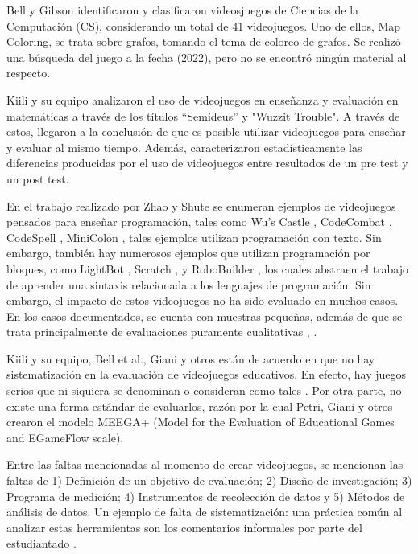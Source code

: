 \documentclass[submission]{eptcs}
\begin{document}
Bell y Gibson \cite{evaluation_of_games_for_teaching_cs} identificaron y clasificaron videosjuegos de Ciencias de la Computación (CS),
considerando un total de 41 videojuegos. Uno de ellos, Map Coloring, se trata sobre grafos, tomando el tema de coloreo de grafos.
Se realizó una búsqueda del juego a la fecha (2022), pero no se encontró ningún material al respecto.

Kiili y su equipo \cite{using_videogames_maths} analizaron el uso de videojuegos en enseñanza
y evaluación en matemáticas a través de los títulos ``Semideus'' y "Wuzzit Trouble". A través
de estos, llegaron a la conclusión de que es posible utilizar videojuegos para enseñar y
evaluar al mismo tiempo. Además, caracterizaron estadísticamente las diferencias producidas por el uso
de videojuegos entre resultados de un pre test y un post test.

En el trabajo realizado por Zhao y Shute \cite{video_game_foster_computational_thinking} se enumeran ejemplos de videojuegos pensados para enseñar programación,
tales como Wu's Castle \cite{wuscastle}, CodeCombat \cite{CodeCombat}, CodeSpell \cite{codespells}, MiniColon \cite{minicolon},
tales ejemplos utilizan programación con texto. Sin embargo, también hay numerosos ejemplos que utilizan programación por
bloques, como LightBot \cite{LightBot}, Scratch \cite{maloney2010scratch}, \cite{scratch} y RoboBuilder \cite{RoboBuilder}, los
cuales abstraen el trabajo de aprender una sintaxis relacionada a los lenguajes de programación.
Sin embargo, el impacto de estos videojuegos no ha sido evaluado en muchos casos. En los casos documentados, se cuenta con
muestras pequeñas, además de que se trata principalmente de evaluaciones puramente cualitativas \cite{video_game_foster_computational_thinking},
\cite{effectiveness_gbl}.

Kiili y su equipo, Bell et al., Giani y otros \cite{petri2018method} están de acuerdo en que no hay sistematización en la evaluación de
videojuegos educativos. En efecto, hay juegos serios que ni siquiera se denominan o consideran como tales
\cite{evaluation_of_games_for_teaching_cs}. Por otra parte, no existe una forma estándar de evaluarlos, razón por
la cual Petri, Giani y otros \cite{petri2018method} crearon el modelo MEEGA+ (Model for the Evaluation of Educational
Games and EGameFlow scale).

Entre las faltas mencionadas al momento de crear videojuegos, se mencionan las faltas de 1) Definición de un objetivo
de evaluación; 2) Diseño de investigación; 3) Programa de medición; 4) Instrumentos de recolección de datos y 5) Métodos
de análisis de datos. Un ejemplo de falta de sistematización: una práctica común al analizar estas herramientas son los 
comentarios informales por parte del estudiantado \cite{petri2018method}.
\end{document}
